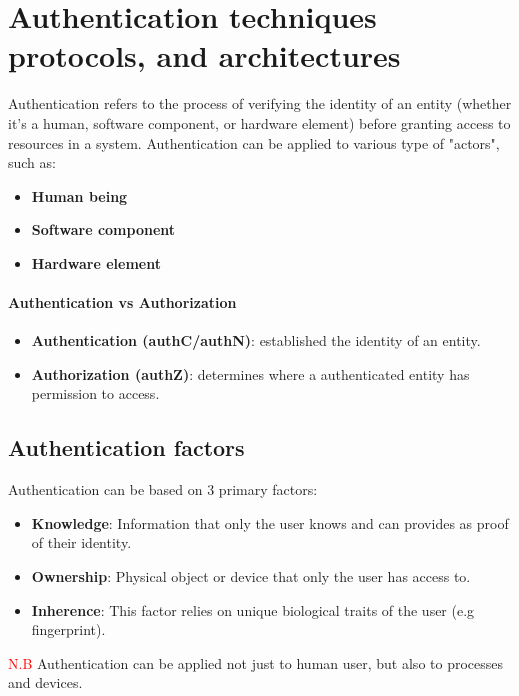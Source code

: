 \chapter{Authentication techniques protocols, and architectures}

Authentication refers to the process of verifying the identity of an entity (whether it's a human, software component, or hardware element) 
before granting access to resources in a system. Authentication can be applied to various type of "actors", such as:
\begin{itemize}
    \item \textbf{Human being}
    \item \textbf{Software component}
    \item \textbf{Hardware element}
\end{itemize}

\subsubsection{Authentication vs Authorization}
\begin{itemize}
    \item \textbf{Authentication (authC/authN)}: established the identity of an entity.
    \item \textbf{Authorization (authZ)}: determines where a authenticated entity has permission to access.
\end{itemize}

\section{Authentication factors}
Authentication can be based on 3 primary factors:
\begin{itemize}
    \item \textbf{Knowledge}: Information that only the user knows and can provides as proof of their identity.
    \item \textbf{Ownership}: Physical object or device that only the user has access to.
    \item \textbf{Inherence}: This factor relies on unique biological traits of the user (e.g fingerprint).
\end{itemize}
\textcolor{red}{N.B} Authentication can be applied not just to human user, but also to processes and devices.

